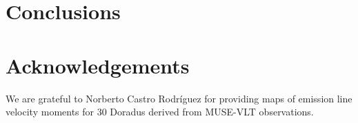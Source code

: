 \documentclass[fleqn,usenatbib, useAMS, a4paper]{mnras}
\begin{document}

\section{Conclusions}\label{sec:conclusions}

    

    
    

    


\section*{Acknowledgements}

We are grateful to Norberto Castro Rodríguez for providing maps of emission line velocity moments for 30 Doradus derived from MUSE-VLT observations.





\clearpage

\end{document}
